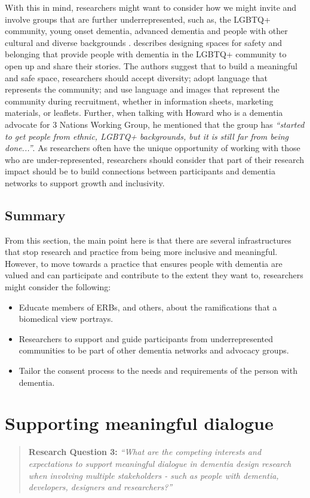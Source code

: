 With this in mind, researchers might want to consider how we might invite and involve groups that are further underrepresented, such as, the LGBTQ+ community, young onset dementia, advanced dementia and people with other cultural and diverse backgrounds \citep{foley_struggle_2019, bryden_before_2015}. \cite{mcgovern2014forgotten} describes designing spaces for safety and belonging that provide people with dementia in the LGBTQ+ community to open up and share their stories. The authors suggest that to build a meaningful and safe space, researchers should accept diversity; adopt language that represents the community; and use language and images that represent the community during recruitment, whether in information sheets, marketing materials, or leaflets. Further, when talking with Howard who is a dementia advocate for 3 Nations Working Group, he mentioned that the group has \textit{``started to get people from ethnic, LGBTQ+ backgrounds, but it is still far from being done...''}. As researchers often have the unique opportunity of working with those who are under-represented, researchers should consider that part of their research impact should be to build connections between participants and dementia networks to support growth and inclusivity.

\subsection{Summary}
\label{EthicsSummary}
From this section, the main point here is that there are several infrastructures that stop research and practice from being more inclusive and meaningful. However, to move towards a practice that ensures people with dementia are valued and can participate and contribute to the extent they want to, researchers might consider the following:
\begin{itemize}
    \item Educate members of ERBs, and others, about the ramifications that a biomedical view portrays.
    \item Researchers to support and guide participants from underrepresented communities to be part of other dementia networks and advocacy groups.
    \item Tailor the consent process to the needs and requirements of the person with dementia.
\end{itemize}

\section{Supporting meaningful dialogue}
\label{Discussion:RQ3}
\begin{quote}
\textbf{    Research Question 3:
}    
\textit{ “What are the competing interests and expectations to support meaningful dialogue in dementia design research when involving multiple stakeholders - such as people with dementia, developers, designers and researchers?”}
\end{quote}

